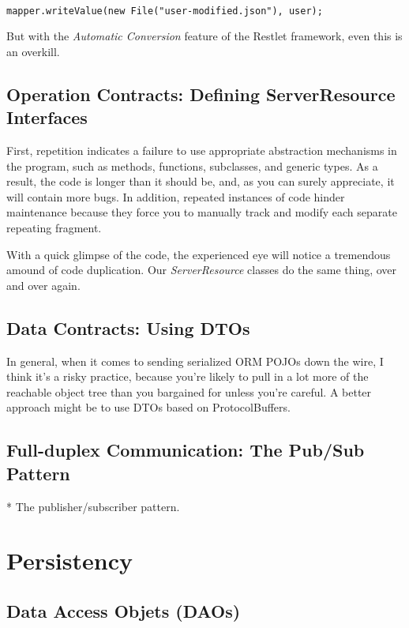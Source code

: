 \documentclass[12pt]{scrartcl}
\begin{document}
\begin{lstlisting}

mapper.writeValue(new File("user-modified.json"), user);

\end{lstlisting}

But with the \emph{Automatic Conversion} feature of the Restlet framework, even this is an overkill.

\subsection{Operation Contracts: Defining ServerResource Interfaces} First, repetition indicates a failure to use appropriate abstraction mechanisms in the program, such as methods, functions, subclasses, and generic types. As a result, the code is longer than it should be, and, as you can surely appreciate, it will contain more bugs. In addition, repeated instances of code hinder maintenance because they force you to manually track and modify each separate repeating fragment. \cite{Spinellis:2006:CQO:1197266}

With a quick glimpse of the code, the experienced eye will notice a tremendous amound of code duplication. Our \emph{ServerResource} classes do the same thing, over and over again.

\subsection{Data Contracts: Using DTOs}

In general, when it comes to sending serialized ORM POJOs down the wire, I think it's a risky practice, because you're likely to pull in a lot more of the reachable object tree than you bargained for unless you're careful. A better approach might be to use DTOs based on ProtocolBuffers.

\subsection{Full-duplex Communication: The Pub/Sub Pattern}

* The publisher/subscriber pattern.

\section{Persistency}

\subsection{Data Access Objets (DAOs)}
\end{document}

